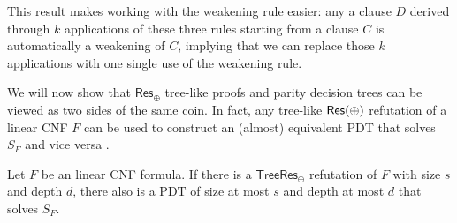 This result makes working with the weakening rule easier: any a clause $D$ derived through $k$ applications of these three rules starting from a clause $C$ is automatically a weakening of $C$, implying that we can replace those $k$ applications with one single use of the weakening rule.

We will now show that $\mathsf{Res}_\oplus$ tree-like proofs and parity decision trees can be viewed as two sides of the same coin. In fact, any tree-like $\mathsf{Res(\oplus)}$ refutation of a linear CNF $F$ can be used to construct an (almost) equivalent PDT that solves $S_F$ and vice versa \cite{res_lin_2}.

\begin{lemma}
    Let $F$ be an linear CNF formula. If there is a $\mathsf{TreeRes}_\oplus$ refutation of $F$ with size $s$ and depth $d$, there also is a PDT of size at most $s$ and depth at most $d$ that solves $S_F$.
\end{lemma}

